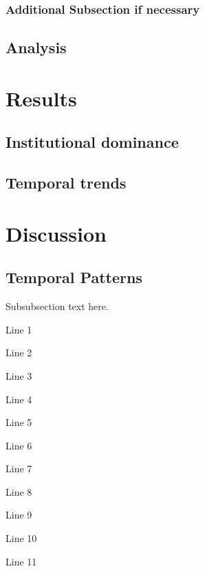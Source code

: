 \documentclass[]{rsos}%
\begin{document}
\hypertarget{additional-subsection-if-necessary}{%
\subsubsection{Additional Subsection if necessary}\label{additional-subsection-if-necessary}}

\hypertarget{analysis}{%
\subsection{Analysis}\label{analysis}}

\hypertarget{results}{%
\section{Results}\label{results}}

\hypertarget{institutional-dominance}{%
\subsection{Institutional dominance}\label{institutional-dominance}}

\hypertarget{temporal-trends}{%
\subsection{Temporal trends}\label{temporal-trends}}

\hypertarget{discussion}{%
\section{Discussion}\label{discussion}}

\hypertarget{temporal-patterns}{%
\subsection{Temporal Patterns}\label{temporal-patterns}}

Subsubsection text here.

Line 1

Line 2

Line 3

Line 4

Line 5

Line 6

Line 7

Line 8

Line 9

Line 10

Line 11
\end{document}

